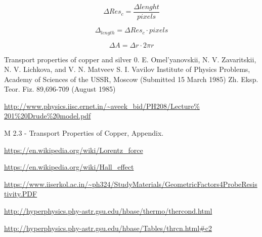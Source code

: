 \documentclass[openany,11pt,a4paper]{report}
\begin{document}
\begin{equation*}
\Delta Res_{c} = \dfrac{\Delta lenght }{pixels} 
\end{equation*}

\begin{equation*}
\Delta_{length} =  \Delta Res_{c} \cdot pixels 
\end{equation*}
 
\begin{equation*}
\Delta A =  \Delta r \cdot 2 \pi r 
\end{equation*}










\begin{thebibliography}{99}


 Transport properties of copper and silver
0. E. Omel'yanovskii, N. V. Zavaritskii, N. V. Lichkova, and V. N. Matveev
S. I. Vavilov Institute of Physics Problems, Academy of Sciences of the USSR, Moscow
(Submitted 15 March 1985)
Zh. Eksp. Teor. Fiz. 89,696-709 (August 1985)

 \url{http://www.physics.iisc.ernet.in/~aveek_bid/PH208/Lecture\% 201\%20Drude\%20model.pdf}


 M 2.3 - Transport Properties of Copper, Appendix.

 \url{https://en.wikipedia.org/wiki/Lorentz_force}

 \url{https://en.wikipedia.org/wiki/Hall_effect}


 \url{https://www.iiserkol.ac.in/~ph324/StudyMaterials/GeometricFactors4ProbeResistivity.PDF}

 \url{http://hyperphysics.phy-astr.gsu.edu/hbase/thermo/thercond.html}


 \url{http://hyperphysics.phy-astr.gsu.edu/hbase/Tables/thrcn.html#c2}

\end{thebibliography}
\end{document}
